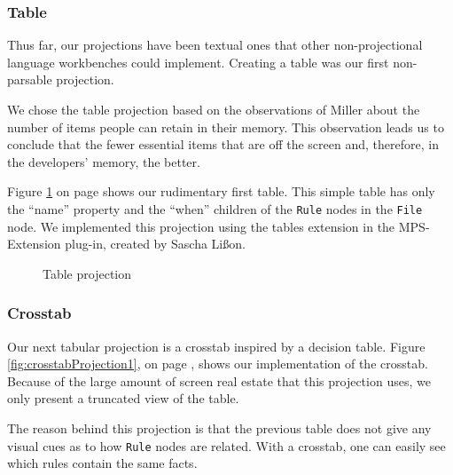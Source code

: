 \subsubsection{Table}
Thus far, our projections have been textual ones that other non-projectional language workbenches could implement.
Creating a table was our first non-parsable projection.

We chose the table projection based on the observations of Miller\cite{miller1956magical} about the number of items people can retain in their memory.
This observation leads us to conclude that the fewer essential items that are off the screen and, therefore, in the developers' memory, the better.

Figure \ref{fig:tableProjection1} on page \pageref{fig:tableProjection1} shows our rudimentary first table.
This simple table has only the ``name'' property and the ``when'' children of the \texttt{Rule} nodes in the \texttt{File} node.
We implemented this projection using the tables extension in the MPS-Extension plug-in, created by Sascha Lißon.

\begin{figure}
    \centering
    \caption{Table projection}
    \label{fig:tableProjection1}
\end{figure}

\subsubsection{Crosstab}
Our next tabular projection is a crosstab inspired by a decision table.
Figure \ref{fig:crosstabProjection1}, on page \pageref{fig:crosstabProjection1}, shows our implementation of the crosstab.
Because of the large amount of screen real estate that this projection uses, we only present a truncated view of the table.

The reason behind this projection is that the previous table does not give any visual cues as to how \texttt{Rule} nodes are related.
With a crosstab, one can easily see which rules contain the same facts.

